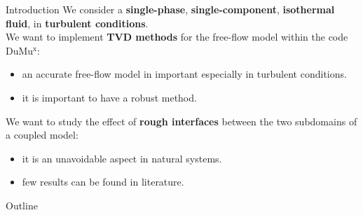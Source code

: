 \documentclass{beamer}
\newcommand{\DUMUX}{DuMu$^\mathrm{x}$\xspace} %
\begin{document}
%
\begin{frame}{Introduction}
We consider a \textbf{single-phase}, \textbf{single-component}, 
\textbf{isothermal fluid}, in \textbf{turbulent conditions}.\\
\vspace{0.3cm}
We want to implement \textbf{TVD methods} for the free-flow model within the 
code \DUMUX:
\begin{itemize}
	\item an accurate free-flow model in important especially in turbulent 
	conditions.
	\item it is important to have a robust method.
\end{itemize}
\vspace{0.3cm}
We want to study the effect of \textbf{rough interfaces} between the two 
subdomains of a coupled model:
\begin{itemize}
	\item it is an unavoidable aspect in natural systems.
	\item few results can be found in literature.
\end{itemize}
\end{frame}
\begin{frame}{Outline}
	\tableofcontents
\end{frame}
\end{document}
